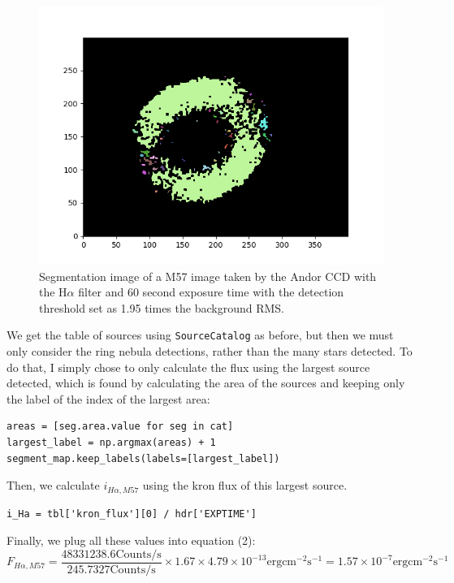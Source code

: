 \documentclass{article}
\begin{document}
\begin{figure}[h!]
    \includegraphics[width=\textwidth]{Figures/M57Hasegmented.png}
    \caption{Segmentation image of a M57 image taken by the Andor CCD with the H$\alpha$ filter and 60 second exposure time with the detection threshold set as 1.95 times the background RMS.}
    \label{fig:M57Hasegmented}
\end{figure}

We get the table of sources using \verb|SourceCatalog| as before, but then we must only consider the ring nebula detections, rather than the many stars detected. To do that, I simply chose to only calculate the flux using the largest source detected, which is found by calculating the area of the sources and keeping only the label of the index of the largest area:

\begin{verbatim}
areas = [seg.area.value for seg in cat]
largest_label = np.argmax(areas) + 1
segment_map.keep_labels(labels=[largest_label])
\end{verbatim}

Then, we calculate $i_{H\alpha, M57}$ using the kron flux of this largest source. 
\begin{verbatim}
i_Ha = tbl['kron_flux'][0] / hdr['EXPTIME']
\end{verbatim}

Finally, we plug all these values into equation (2):
\[
F_{H\alpha, M57} = \frac{48331238.6 \mathrm{Counts/s}}{245.7327 \mathrm{Counts/s}} \times 1.67 \times 4.79 \times 10^{-13} \mathrm{erg} \mathrm{cm}^{-2} \mathrm{s}^{-1} = 1.57 \times 10^{-7} \mathrm{erg} \mathrm{cm}^{-2} \mathrm{s}^{-1}
\]
\end{document}
